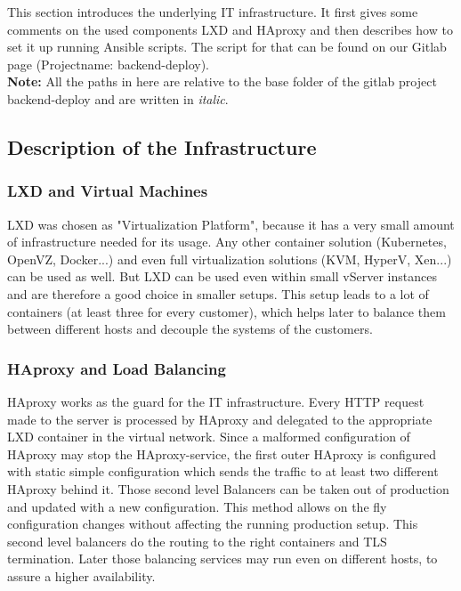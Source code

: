 This section introduces the underlying IT infrastructure. It first gives some comments on the used components LXD and HAproxy and then describes how to set it up running Ansible scripts. The script for that can be found on our Gitlab page (Projectname: backend-deploy).\\
\textbf{Note:} All the paths in here are relative to the base folder of the gitlab project backend-deploy and are written in \textit{italic}.

\subsection{Description of the Infrastructure}

\subsubsection{LXD and Virtual Machines}

LXD was chosen as "Virtualization Platform", because it has a very small amount of infrastructure needed for its usage. Any other container solution (Kubernetes, OpenVZ, Docker...) and even full virtualization solutions (KVM, HyperV, Xen...) can be used as well.
But LXD can be used even within small vServer instances and are therefore a good choice in smaller setups. This setup leads to a lot of containers (at least three for every customer), which helps later to balance them between different hosts and decouple the systems of the customers.


\subsubsection{HAproxy and Load Balancing}\label{subsubsection:haproxys}
HAproxy works as the guard for the IT infrastructure. Every HTTP request made to the server is processed by HAproxy and delegated to the appropriate LXD container in the virtual network.
Since a malformed configuration of HAproxy may stop the HAproxy-service, the first outer HAproxy is configured with static simple configuration which sends the traffic to at least two different HAproxy behind it. Those second level Balancers can be taken out of production and updated with a new configuration. This method allows on the fly configuration changes without affecting the running production setup.
This second level balancers do the routing to the right containers and TLS termination.
Later those balancing services may run even on different hosts, to assure a higher availability.

